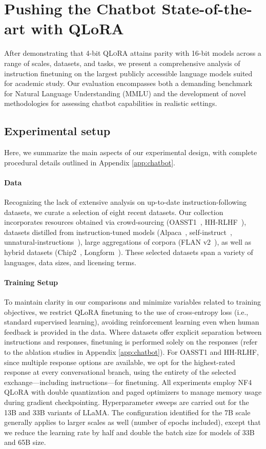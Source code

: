 \section{Pushing the Chatbot State-of-the-art with QLoRA}
\label{sec:pushing}
After demonstrating that 4-bit \textsc{QLoRA} attains parity with 16-bit models across a range of scales, datasets, and tasks, we present a comprehensive analysis of instruction finetuning on the largest publicly accessible language models suited for academic study. Our evaluation encompasses both a demanding benchmark for Natural Language Understanding (MMLU) and the development of novel methodologies for assessing chatbot capabilities in realistic settings.

\subsection{Experimental setup} Here, we summarize the main aspects of our experimental design, with complete procedural details outlined in Appendix \ref{app:chatbot}.

\paragraph{Data} Recognizing the lack of extensive analysis on up-to-date instruction-following datasets, we curate a selection of eight recent datasets. Our collection incorporates resources obtained via crowd-sourcing (OASST1~\citep{kopf2023openassistant}, HH-RLHF~\citep{bai2022training}), datasets distilled from instruction-tuned models (Alpaca~\citep{alpaca}, self-instruct~\citep{wang2022self}, unnatural-instructions~\citep{honovich2022unnatural}), large aggregations of corpora (FLAN v2~\citep{chung2022scaling}), as well as hybrid datasets (Chip2~\citep{laion2023}, Longform~\citep{koksal2023longform}). These selected datasets span a variety of languages, data sizes, and licensing terms.

\paragraph{Training Setup} To maintain clarity in our comparisons and minimize variables related to training objectives, we restrict QLoRA finetuning to the use of cross-entropy loss (i.e., standard supervised learning), avoiding reinforcement learning even when human feedback is provided in the data. Where datasets offer explicit separation between instructions and responses, finetuning is performed solely on the responses (refer to the ablation studies in Appendix \ref{app:chatbot}). For OASST1 and HH-RLHF, since multiple response options are available, we opt for the highest-rated response at every conversational branch, using the entirety of the selected exchange—including instructions—for finetuning. All experiments employ NF4 \textsc{QLoRA} with double quantization and paged optimizers to manage memory usage during gradient checkpointing. Hyperparameter sweeps are carried out for the 13B and 33B variants of LLaMA. The configuration identified for the 7B scale generally applies to larger scales as well (number of epochs included), except that we reduce the learning rate by half and double the batch size for models of 33B and 65B size.

